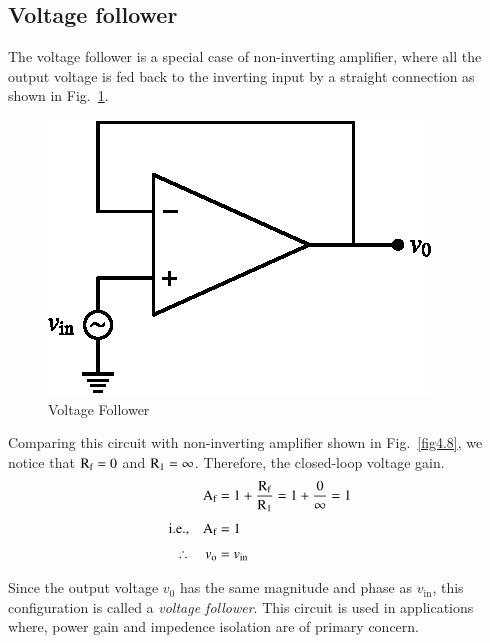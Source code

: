 \subsection{Voltage follower}\label{sec4.6.3}

The voltage follower is a special case of non-inverting amplifier, where all the output voltage is fed back to the inverting input by a straight connection as shown in Fig.~\ref{fig4.9}.
\begin{figure}[H]
\centering
\includegraphics{chap4/fig4.19.eps}
\caption{Voltage Follower}\label{fig4.9}
\end{figure}

Comparing this circuit with non-inverting amplifier shown in Fig.~\ref{fig4.8}, we notice that $\textrm{R}_{\textrm{f}}=0$ and $\textrm{R}_{1}=\infty$. Therefore, the closed-loop voltage gain.
\begin{align}
\textrm{A}_{\textrm{f}} &= 1+\frac{\textrm{R}_{\textrm{f}}}{\textrm{R}_{1}}=1+\frac{0}{\infty}=1\notag\\[3pt]
\text{i.e.,}\quad \textrm{A}_{\textrm{f}} &=1\label{eq4.28}\\[3pt]
\therefore\quad v_{\textrm{o}} &= v_{\text{in}}\notag
\end{align}

Since the output voltage $v_{0}$ has the same magnitude and phase as $v_{\text{in}}$, this configuration is called a {\em voltage follower}. This circuit is used in applications where, power gain and impedence isolation are of primary concern.


